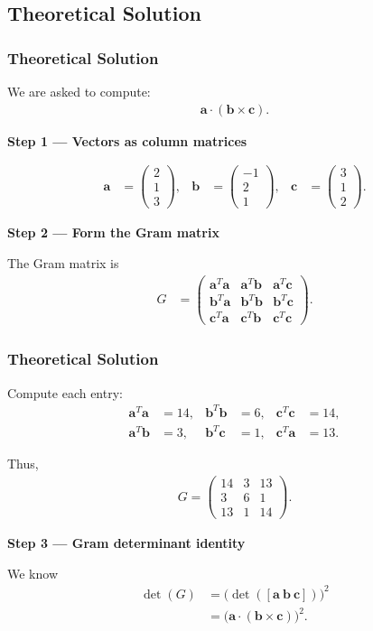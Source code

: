 \documentclass{beamer}
\theoremstyle{remark}
\newcommand{\myvec}[1]{\ensuremath{\begin{pmatrix}#1\end{pmatrix}}}
\let\vec\mathbf
\numberwithin{equation}{section}
\begin{document}
\subsection{Theoretical Solution }
\begin{frame}
\frametitle{Theoretical Solution}
We are asked to compute:
\begin{align}
\vec{a} \cdot (\vec{b} \times \vec{c}).
\end{align}

\textbf{Step 1 — Vectors as column matrices}

\begin{align}
\vec{a} &= \myvec{2\\1\\3}, &
\vec{b} &= \myvec{-1\\2\\1}, &
\vec{c} &= \myvec{3\\1\\2}.
\end{align}

\textbf{Step 2 — Form the Gram matrix}

The Gram matrix is
\begin{align}
G &=
\myvec{
\vec{a}^T \vec{a} & \vec{a}^T \vec{b} & \vec{a}^T \vec{c} \\
\vec{b}^T \vec{a} & \vec{b}^T \vec{b} & \vec{b}^T \vec{c} \\
\vec{c}^T \vec{a} & \vec{c}^T \vec{b} & \vec{c}^T \vec{c}
}.
\end{align}
\end{frame}

\begin{frame}
\frametitle{Theoretical Solution}
Compute each entry:
\begin{align}
\vec{a}^T \vec{a} &= 14, &
\vec{b}^T \vec{b} &= 6, &
\vec{c}^T \vec{c} &= 14, \\
\vec{a}^T \vec{b} &= 3, &
\vec{b}^T \vec{c} &= 1, &
\vec{c}^T \vec{a} &= 13.
\end{align}

Thus,
\begin{align}
G = \myvec{
14 & 3 & 13 \\
3 & 6 & 1 \\
13 & 1 & 14
}.
\end{align}

\textbf{Step 3 — Gram determinant identity}

We know
\begin{align}
\det(G) &= \big(\det([\vec{a}\ \vec{b}\ \vec{c}])\big)^2 \\
        &= \big(\vec{a} \cdot (\vec{b} \times \vec{c})\big)^2.
\end{align}

\end{frame}
\end{document}
